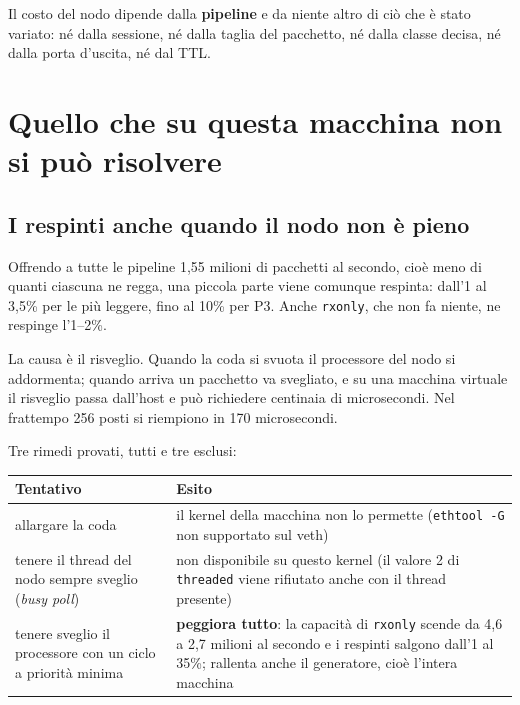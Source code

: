 \documentclass[11pt,a4paper,oneside]{report}
\begin{document}
\begin{lezione}
Il costo del nodo dipende dalla \textbf{pipeline} e da niente altro di ciò che è
stato variato: né dalla sessione, né dalla taglia del pacchetto, né dalla classe
decisa, né dalla porta d'uscita, né dal TTL.
\end{lezione}

\section{Quello che su questa macchina non si può risolvere}

\subsection*{I respinti anche quando il nodo non è pieno}

Offrendo a tutte le pipeline 1,55 milioni di pacchetti al secondo, cioè meno di
quanti ciascuna ne regga, una piccola parte viene comunque respinta: dall'1 al 3,5\%
per le più leggere, fino al 10\% per P3. Anche \texttt{rxonly}, che non fa
niente, ne respinge l'1--2\%.

La causa è il risveglio. Quando la coda si svuota il processore del nodo si
addormenta; quando arriva un pacchetto va svegliato, e su una macchina virtuale
il risveglio passa dall'host e può richiedere centinaia di microsecondi. Nel
frattempo 256 posti si riempiono in 170 microsecondi.

Tre rimedi provati, tutti e tre esclusi:
\begin{center}
\small
\begin{tabular}{@{}p{5.6cm}p{8.4cm}@{}}
\toprule
\textbf{Tentativo} & \textbf{Esito} \\
\midrule
allargare la coda & il kernel della macchina non lo permette
                    (\texttt{ethtool -G} non supportato sul veth) \\
tenere il thread del nodo sempre sveglio (\emph{busy poll}) & non disponibile su
                    questo kernel (il valore 2 di \texttt{threaded} viene rifiutato
                    anche con il thread presente) \\
tenere sveglio il processore con un ciclo a priorità minima & \textbf{peggiora
                    tutto}: la capacità di \texttt{rxonly} scende da 4,6 a 2,7 milioni
                    al secondo e i respinti salgono dall'1 al 35\%; rallenta anche il
                    generatore, cioè l'intera macchina \\
\bottomrule
\end{tabular}
\end{center}
\end{document}
